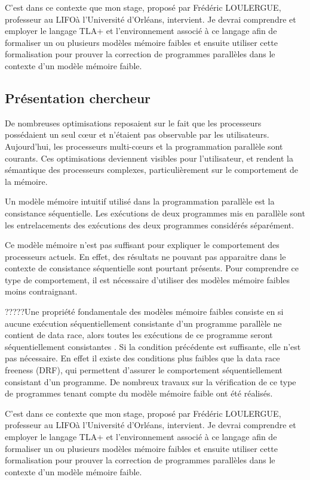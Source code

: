 \documentclass[12pt,a4paper]{article}
\begin{document}
C'est dans ce contexte que mon stage, proposé par Frédéric LOULERGUE, professeur au LIFO\footnotemark[1] à l'Université d'Orléans, intervient. Je devrai comprendre et employer le langage TLA+ \cite{Lamport:2002:SST:579617} et l'environnement associé à ce langage afin de formaliser un ou plusieurs modèles mémoire faibles et ensuite utiliser cette formalisation pour prouver la correction de programmes parallèles dans le contexte d'un modèle mémoire faible. 

\subsection{Présentation chercheur}
De nombreuses optimisations reposaient sur le fait que les processeurs possédaient un seul cœur et n'étaient pas observable par les utilisateurs.
Aujourd'hui, les processeurs multi-cœurs et la programmation parallèle sont courants. Ces optimisations deviennent visibles pour l'utilisateur, et rendent la sémantique des processeurs complexes, particulièrement sur le comportement de la mémoire.

Un modèle mémoire intuitif utilisé dans la programmation parallèle est la consistance séquentielle. Les exécutions de deux programmes mis en parallèle sont les entrelacements des exécutions des deux programmes considérés séparément.
 
Ce modèle mémoire n'est pas suffisant pour expliquer le comportement des processeurs actuels. En effet, des résultats ne pouvant pas apparaitre dans le contexte de consistance séquentielle sont pourtant présents. Pour comprendre ce type de comportement, il est nécessaire d'utiliser des modèles mémoire faibles \cite{Adve:1996:SMC:619013.620590} moins contraignant. 

?????Une propriété fondamentale des modèles mémoire faibles consiste en si aucune exécution séquentiellement consistante d'un programme parallèle ne contient de data race, alors toutes les exécutions de ce programme seront séquentiellement consistantes \cite{Saraswat:2007:TMM:1229428.1229469}.
Si la condition précédente est suffisante, elle n'est pas nécessaire. En effet il existe des conditions plus faibles que la data race freeness (DRF), qui permettent d'assurer le comportement séquentiellement consistant d'un programme\cite{Owens:2010:RIC:1883978.1884011}. De nombreux travaux sur la vérification de ce type de programmes tenant compte du modèle mémoire faible ont été réalisés\cite{Turon:2014:GNW:2714064.2660243}.

C'est dans ce contexte que mon stage, proposé par Frédéric LOULERGUE, professeur au LIFO\footnotemark[1] à l'Université d'Orléans, intervient. Je devrai comprendre et employer le langage TLA+ \cite{Lamport:2002:SST:579617} et l'environnement associé à ce langage afin de formaliser un ou plusieurs modèles mémoire faibles et ensuite utiliser cette formalisation pour prouver la correction de programmes parallèles dans le contexte d'un modèle mémoire faible. 
 
\end{document}
